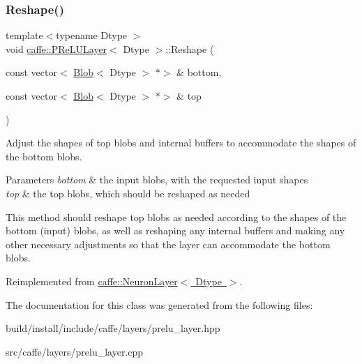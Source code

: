 \subsubsection{\texorpdfstring{Reshape()}{Reshape()}\hspace{0.1cm}{\footnotesize\ttfamily [2/2]}}
{\footnotesize\ttfamily template$<$typename Dtype $>$ \\
void \mbox{\hyperlink{classcaffe_1_1_p_re_l_u_layer}{caffe\+::\+P\+Re\+L\+U\+Layer}}$<$ Dtype $>$\+::Reshape (\begin{DoxyParamCaption}\item[{const vector$<$ \mbox{\hyperlink{classcaffe_1_1_blob}{Blob}}$<$ Dtype $>$ $\ast$$>$ \&}]{bottom,  }\item[{const vector$<$ \mbox{\hyperlink{classcaffe_1_1_blob}{Blob}}$<$ Dtype $>$ $\ast$$>$ \&}]{top }\end{DoxyParamCaption})\hspace{0.3cm}{\ttfamily [virtual]}}



Adjust the shapes of top blobs and internal buffers to accommodate the shapes of the bottom blobs. 


\begin{DoxyParams}{Parameters}
{\em bottom} & the input blobs, with the requested input shapes \\
\hline
{\em top} & the top blobs, which should be reshaped as needed\\
\hline
\end{DoxyParams}
This method should reshape top blobs as needed according to the shapes of the bottom (input) blobs, as well as reshaping any internal buffers and making any other necessary adjustments so that the layer can accommodate the bottom blobs. 

Reimplemented from \mbox{\hyperlink{classcaffe_1_1_neuron_layer_a6d0facf4a5e6f459cf1cb8b28d945790}{caffe\+::\+Neuron\+Layer$<$ Dtype $>$}}.



The documentation for this class was generated from the following files\+:\begin{DoxyCompactItemize}
\item 
build/install/include/caffe/layers/prelu\+\_\+layer.\+hpp\item 
src/caffe/layers/prelu\+\_\+layer.\+cpp\end{DoxyCompactItemize}

